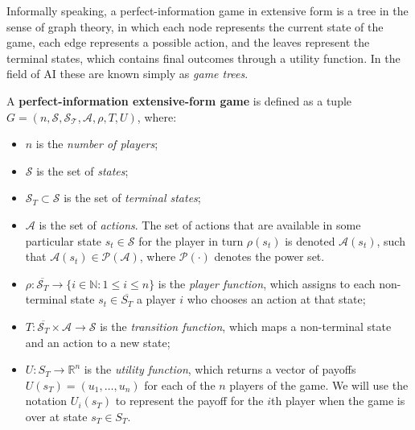 \documentclass{article}
\begin{document}
Informally speaking, a perfect-information game in extensive form is a tree in the sense of graph
theory, in which each node represents the current state of the game, each edge represents a
possible action, and the leaves represent the terminal states, which contains final outcomes
through a utility function. In the field of AI these are known simply as \emph{game trees}.

A \textbf{perfect-information extensive-form game} is defined as a tuple $G = (n, \mathcal{S},
\mathcal{S_T}, \mathcal{A}, \rho, T, U)$, where:


\begin{itemize}

    \item $n$ is the \emph{number of players};

    \item $\mathcal{S}$ is the set of \emph{states};

    \item $\mathcal{S}_T \subset \mathcal{S}$ is the set of \emph{terminal states};

    \item $\mathcal{A}$ is the set of \emph{actions}. The set of actions that are available in some
    particular state $s_t \in \mathcal{S}$ for the player in turn $\rho(s_t)$ is denoted
    $\mathcal{A}(s_t)$, such that $\mathcal{A}(s_t) \in \mathcal{P}(\mathcal{A})$, where
    $\mathcal{P}(\cdot)$ denotes the power set.

    \item $\rho : \overline{\mathcal{S}_T} \to \{i \in \mathbb{N} : 1 \leq i \leq n \} $ is the
    \emph{player function}, which assigns to each non-terminal state $s_t \in \overline{S_T}$ a
    player $i$ who chooses an action at that state;

    \item $T : \overline{\mathcal{S}_T} \times \mathcal{A} \to \mathcal{S}$ is the \emph{transition
    function}, which maps a non-terminal state and an action to a new state;

    \item $U : S_T \to \mathbb{R}^n $ is the \emph{utility function}, which returns a vector of
    payoffs $U(s_T) = (u_1, \dots, u_n)$ for each of the $n$ players of the game. We will use the
    notation $U_i(s_T)$ to represent the payoff for the $i$th player when the game is over at state
    $s_T \in S_T$.

\end{itemize}
\end{document}
